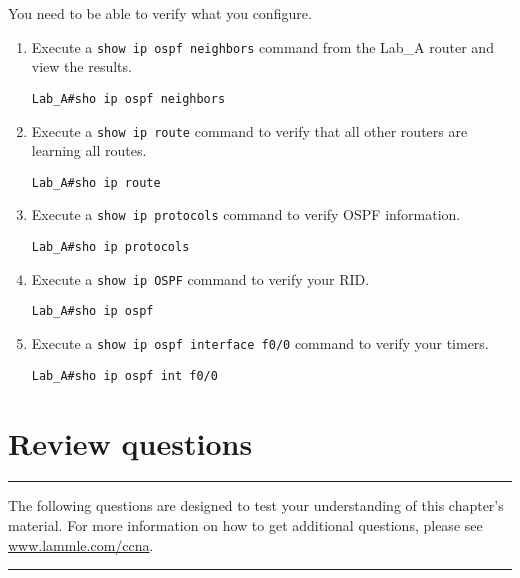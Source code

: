 You need to be able to verify what you configure.

\begin{enumerate}
\item
  Execute a \texttt{show\ ip\ ospf\ neighbors} command from the Lab\_A
  router and view the results.

\begin{verbatim}
Lab_A#sho ip ospf neighbors
\end{verbatim}
\item
  Execute a \texttt{show\ ip\ route} command to verify that all other
  routers are learning all routes.

\begin{verbatim}
Lab_A#sho ip route
\end{verbatim}
\item
  Execute a \texttt{show\ ip\ protocols} command to verify OSPF
  information.

\begin{verbatim}
Lab_A#sho ip protocols
\end{verbatim}
\item
  Execute a \texttt{show\ ip\ OSPF} command to verify your RID.

\begin{verbatim}
Lab_A#sho ip ospf
\end{verbatim}
\item
  Execute a \texttt{show\ ip\ ospf\ interface\ f0/0} command to verify
  your timers.

\begin{verbatim}
Lab_A#sho ip ospf int f0/0
\end{verbatim}
\end{enumerate}



\section{Review questions}

\begin{center}\rule{0.5\linewidth}{0.5pt}\end{center}

The following questions are designed to
test your understanding of this chapter's material. For more information
on how to get additional questions, please see
\href{http://www.lammle.com/ccna}{www.lammle.com/ccna}.

\begin{center}\rule{0.5\linewidth}{0.5pt}\end{center}

